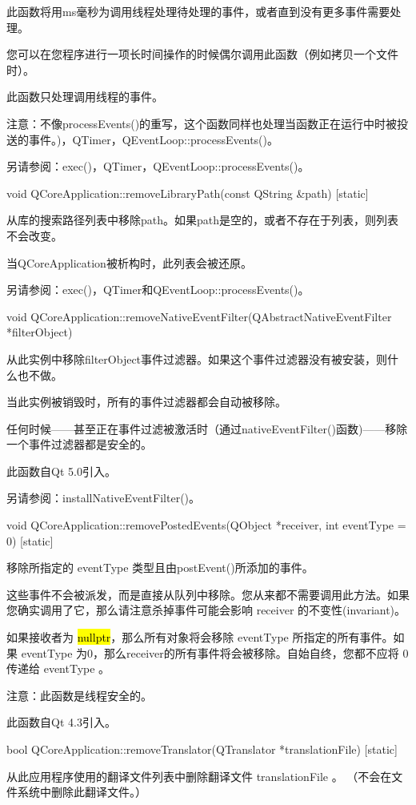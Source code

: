 此函数将用ms毫秒为调用线程处理待处理的事件，或者直到没有更多事件需要处理。

您可以在您程序进行一项长时间操作的时候偶尔调用此函数（例如拷贝一个文件时）。

此函数只处理调用线程的事件。

注意：不像processEvents()的重写，这个函数同样也处理当函数正在运行中时被投送的事件。)，QTimer，QEventLoop::processEvents()。

另请参阅：exec()，QTimer，QEventLoop::processEvents()。

void QCoreApplication::removeLibraryPath(const QString \&path) [static]

从库的搜索路径列表中移除path。如果path是空的，或者不存在于列表，则列表不会改变。

当QCoreApplication被析构时，此列表会被还原。

另请参阅：exec()，QTimer和QEventLoop::processEvents()。

void QCoreApplication::removeNativeEventFilter(QAbstractNativeEventFilter *filterObject)

从此实例中移除filterObject事件过滤器。如果这个事件过滤器没有被安装，则什么也不做。

当此实例被销毁时，所有的事件过滤器都会自动被移除。

任何时候——甚至正在事件过滤被激活时（通过nativeEventFilter()函数)——移除一个事件过滤器都是安全的。

此函数自Qt 5.0引入。

另请参阅：installNativeEventFilter()。

void QCoreApplication::removePostedEvents(QObject *receiver, int eventType = 0) [static]

移除所指定的 eventType 类型且由postEvent()所添加的事件。

这些事件不会被派发，而是直接从队列中移除。您从来都不需要调用此方法。如果您确实调用了它，那么请注意杀掉事件可能会影响 receiver 的不变性(invariant)。

如果接收者为 \hl{nullptr}，那么所有对象将会移除 eventType 所指定的所有事件。如果 eventType 为0，那么receiver的所有事件将会被移除。自始自终，您都不应将 0 传递给 eventType 。

注意：此函数是线程安全的。

此函数自Qt 4.3引入。

bool QCoreApplication::removeTranslator(QTranslator *translationFile) [static]

从此应用程序使用的翻译文件列表中删除翻译文件 translationFile 。 （不会在文件系统中删除此翻译文件。）

